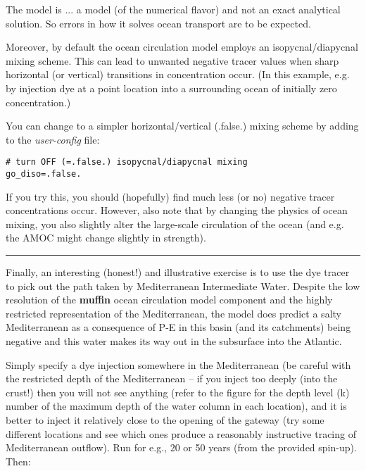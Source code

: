 \documentclass[11pt,fleqn]{book} %
\begin{document}
The model is ... a model (of the numerical flavor) and not an exact analytical solution. So errors in how it solves ocean transport are to be expected.

Moreover, by default the ocean circulation model employs an isopycnal/diapycnal mixing scheme. This can lead to unwanted negative tracer values when sharp horizontal (or vertical) transitions in concentration occur. (In this example, e.g. by injection dye at a point location into a surrounding ocean of initially zero concentration.)

You can change to a simpler horizontal/vertical (.false.) mixing scheme by adding to the \textit{user-config} file:
\vspace{-2mm}
\begin{verbatim}
# turn OFF (=.false.) isopycnal/diapycnal mixing
go_diso=.false.
\end{verbatim}
\vspace{-2mm}

If you try this, you should (hopefully) find much less (or no) negative tracer concentrations occur. However, also note that by changing the physics of ocean mixing, you also slightly alter the large-scale circulation of the ocean (and e.g. the AMOC might change slightly in strength).

\vspace{1mm}
\noindent\rule{4cm}{0.5pt}
\vspace{2mm}

\noindent Finally, an interesting (honest!) and illustrative exercise is to use the dye tracer to pick out the path taken by Mediterranean Intermediate Water. Despite the low resolution of the \textbf{muffin} ocean circulation model component and the highly restricted representation of the Mediterranean, the model does predict a salty Mediterranean as a consequence of P-E in this basin (and its catchments) being negative and this water makes its way out in the subsurface into the Atlantic.

Simply specify a dye injection somewhere in the Mediterranean (be careful with the restricted depth of the Mediterranean – if you inject too deeply (into the crust!) then you will not see anything (refer to the figure for the depth level (k) number of the maximum depth of the water column in each location), and it is better to inject it relatively close to the opening of the gateway (try some different locations and see which ones produce a reasonably instructive tracing of Mediterranean outflow). Run for e.g., 20 or 50 years (from the provided spin-up). Then:
\end{document}
